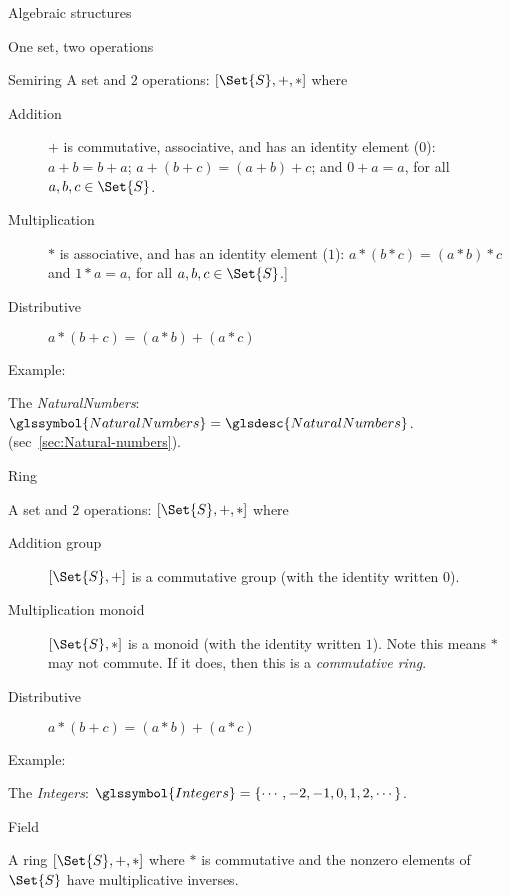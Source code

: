 \begin{plSection}{Algebraic structures}
\begin{plSection}{One set, two operations}
\begin{plSection}{Semiring}
A set and $2$ operations: $\left[ \Set{S}, +, * \right]$
where
\begin{description}
  \item[Addition] $+$ is commutative, associative, and has an 
  identity element ($0$):
  $a + b = b + a$; 
  $a + \left( b + c \right) =\left( a + b  \right) + c $;
   and $ 0 + a = a$, for all $a,b,c \in \Set{S}$.
  \item[Multiplication] $*$ is associative, and has an 
  identity element ($1$):
 $a * \left( b * c \right) =\left( a * b \right) * c $
  and $ 1 * a = a$, for all $a,b,c \in \Set{S}$.]
  \item[Distributive] $a * \left( b + c \right) 
  = \left( a * b \right) + \left( a * c \right)$
\end{description}

Example: 

The \textit{\gls{NaturalNumbers}}: 
$\glssymbol{NaturalNumbers} = \glsdesc{NaturalNumbers}$.
(sec~\ref{sec:Natural-numbers}).

\end{plSection}
\begin{plSection}{Ring}
\label{sec:Ring}
\cite{wiki:RingMathematics}

A set and $2$ operations: $\left[ \Set{S}, +, * \right]$
where
\begin{description}
  \item[Addition group] $\left[ \Set{S}, + \right]$ 
  is a commutative group (with the identity written $0$).
  \item[Multiplication monoid] $\left[ \Set{S}, * \right]$ 
  is a monoid (with the identity written $1$).
  Note this means $*$ may not commute. If it does, 
  then this is a \textit{commutative ring}.
  \item[Distributive] $a * \left( b + c \right) 
  = \left( a * b \right) + \left( a * c \right)$
\end{description}

Example:

The \textit{\gls{Integers}}: 
$\glssymbol{Integers} = \left\{\cdots, -2, -1, 0, 1, 2, \cdots\right\}$.

\end{plSection}
\begin{plSection}{Field}
\label{sec:Field}
\cite{wiki:FieldMathematics}

A ring $\left[ \Set{S}, +, * \right]$ where
$*$ is commutative and the nonzero elements of $\Set{S}$
have multiplicative inverses.


\end{plSection}
\end{plSection}
\end{plSection}
